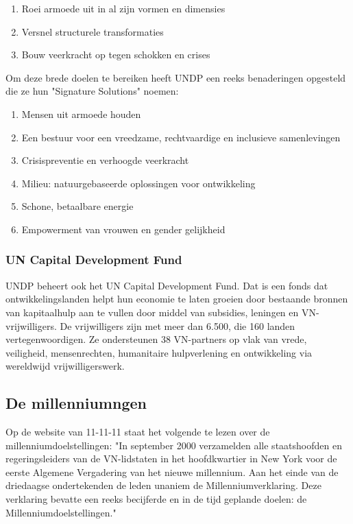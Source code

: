 \begin{enumerate}
\item Roei armoede uit in al zijn vormen en dimensies
\item Versnel structurele transformaties
\item Bouw veerkracht op tegen schokken en crises
\end{enumerate}

Om deze brede doelen te bereiken heeft UNDP een reeks benaderingen opgesteld die ze hun "Signature Solutions" noemen:

\begin{enumerate}
	\item Mensen uit armoede houden
	\item Een bestuur voor een vreedzame, rechtvaardige en inclusieve samenlevingen
	\item Crisispreventie en verhoogde veerkracht
	\item Milieu: natuurgebaseerde oplossingen voor ontwikkeling
	\item Schone, betaalbare energie
	\item Empowerment van vrouwen en gender gelijkheid
\end{enumerate}

\subsubsection{UN Capital Development Fund}
UNDP beheert ook het UN Capital Development Fund. Dat is een fonds dat ontwikkelingslanden helpt hun economie te laten groeien door bestaande bronnen van kapitaalhulp aan te vullen door middel van subsidies, leningen en VN-vrijwilligers. De vrijwilligers zijn met meer dan 6.500, die 160 landen vertegenwoordigen. Ze ondersteunen 38 VN-partners op vlak van vrede, veiligheid, mensenrechten, humanitaire hulpverlening en ontwikkeling via wereldwijd vrijwilligerswerk. \autocite{DevelopmentProgram2020}

\subsection{De millenniumngen}
Op de website van 11-11-11 staat het volgende te lezen over de millenniumdoelstellingen: "In september 2000 verzamelden alle staatshoofden en regeringsleiders van de VN-lidstaten in het hoofdkwartier in New York voor de eerste Algemene Vergadering van het nieuwe millennium. Aan het einde van de driedaagse ondertekenden de leden unaniem de Millenniumverklaring. Deze verklaring bevatte een reeks becijferde en in de tijd geplande doelen: de Millenniumdoelstellingen." \autocite{11.11.112019}

